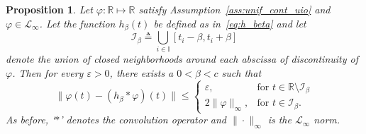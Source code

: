 \documentclass[times, doublespace]{rncauth}
\newtheorem{prop}{Proposition}
\begin{document}
\begin{prop}\label{prop:filt_pw_cont}
	Let $\varphi:\mathbb{R}\mapsto \mathbb{R}$ satisfy Assumption~\ref{ass:unif_cont_uio} and $\varphi\in\mathcal L_\infty$. Let the function $h_\beta(t)$ be defined as in~\eqref{eq:h_beta} and let \begin{equation}\label{eq:I_beta}
	\mathcal I_\beta \triangleq \bigcup_{i\in\mathbb I} [t_i-\beta, t_i+\beta]
	\end{equation}
	denote the union of closed neighborhoods around each abscissa of discontinuity of $\varphi$.  Then for every $\varepsilon>0$, there exists a $0<\beta<c$ such that
	\begin{equation}\label{eq:prop1}
	\|\varphi(t) - (h_\beta\ast \varphi)(t)\| \le \begin{cases}
	\varepsilon, & \text{for } t\in \mathbb{R}\setminus\mathcal{I}_\beta\\
	2\|\varphi\|_\infty, & \text{for }t\in \mathcal I_\beta.
	\end{cases}
	\end{equation}
	As before, `$\ast$' denotes the convolution operator and $\|\cdot\|_\infty$ is the $\mathcal{L}_\infty$ norm.
\end{prop}
\end{document}
